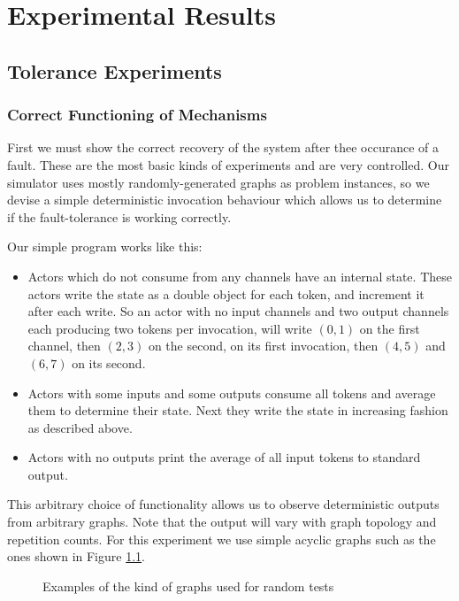 \chapter{Experimental Results}
\label{chapExperiment}

\section{Tolerance Experiments}

\subsection{Correct Functioning of Mechanisms}

First we must show the correct recovery of the system after thee occurance of a fault.
These are the most basic kinds of experiments and are very controlled.
Our simulator uses mostly randomly-generated graphs as problem instances, so we devise a simple deterministic invocation behaviour which allows us to determine if the fault-tolerance is working correctly.

Our simple program works like this:
\begin{itemize}
	\item Actors which do not consume from any channels have an internal state.
			These actors write the state as a double object for each token, and increment it after each write.
			So an actor with no input channels and two output channels each producing two tokens per invocation, will write $(0,1)$ on the first channel, then $(2,3)$ on the second, on its first invocation, then $(4, 5)$ and $(6, 7)$ on its second.
	\item Actors with some inputs and some outputs consume all tokens and average them to determine their state.
			Next they write the state in increasing fashion as described above.
	\item Actors with no outputs print the average of all input tokens to standard output.
\end{itemize}
\noindent This arbitrary choice of functionality allows us to observe deterministic outputs from arbitrary graphs.
Note that the output will vary with graph topology and repetition counts.
For this experiment we use simple acyclic graphs such as the ones shown in Figure \ref{figRGraph}.

\begin{figure}
\begin{center}
	
\caption{Examples of the kind of graphs used for random tests}
\label{figRGraph}
\end{center}
\end{figure}

